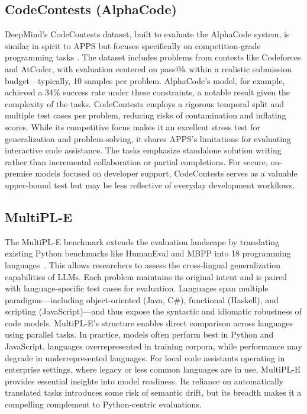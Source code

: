 \subsection{CodeContests (AlphaCode)}
DeepMind’s CodeContests dataset, built to evaluate the AlphaCode system, is similar in spirit to \gls{APPS} but focuses specifically on competition-grade programming tasks \autocite{Li2022}. The dataset includes problems from contests like Codeforces and AtCoder, with evaluation centered on pass@k within a realistic submission budget—typically, 10 samples per problem. AlphaCode’s model, for example, achieved a 34\% success rate under these constraints, a notable result given the complexity of the tasks. CodeContests employs a rigorous temporal split and multiple test cases per problem, reducing risks of contamination and inflating scores. While its competitive focus makes it an excellent stress test for generalization and problem-solving, it shares \gls{APPS}’s limitations for evaluating interactive code assistance. The tasks emphasize standalone solution writing rather than incremental collaboration or partial completions. For secure, on-premise models focused on developer support, CodeContests serves as a valuable upper-bound test but may be less reflective of everyday development workflows.

\subsection{MultiPL-E}
The MultiPL-E benchmark extends the evaluation landscape by translating existing Python benchmarks like HumanEval and \gls{MBPP} into 18 programming languages~\autocite{Cassano2022}. This allows researchers to assess the cross-lingual generalization capabilities of LLMs. Each problem maintains its original intent and is paired with language-specific test cases for evaluation. Languages span multiple paradigms—including object-oriented (Java, C\#), functional (Haskell), and scripting (JavaScript)—and thus expose the syntactic and idiomatic robustness of code models. MultiPL-E's structure enables direct comparison across languages using parallel tasks. In practice, models often perform best in Python and JavaScript, languages overrepresented in training corpora, while performance may degrade in underrepresented languages. For local code assistants operating in enterprise settings, where legacy or less common languages are in use, MultiPL-E provides essential insights into model readiness. Its reliance on automatically translated tasks introduces some risk of semantic drift, but its breadth makes it a compelling complement to Python-centric evaluations.

